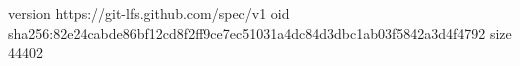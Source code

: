 version https://git-lfs.github.com/spec/v1
oid sha256:82e24cabde86bf12cd8f2ff9ce7ec51031a4dc84d3dbc1ab03f5842a3d4f4792
size 44402
